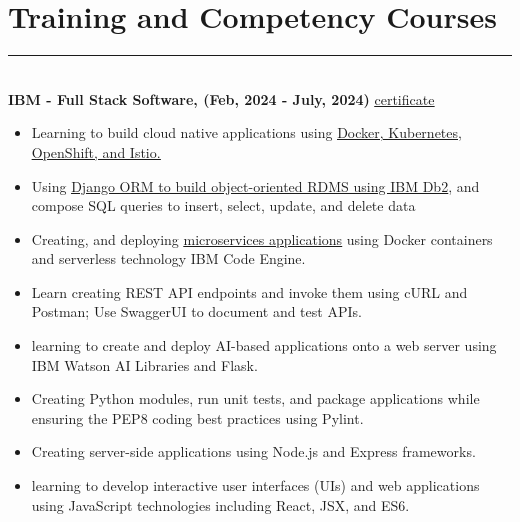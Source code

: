 \documentclass[12pt]{article}
\begin{document}
\vspace{-5mm}\section*{\fontsize{14}{1}\selectfont\color{color_29791}Training and Competency Courses}\vspace{-9pt} 
\rule{\textwidth}{0.4pt}
\vspace{2pt}
\\\textbf{IBM - Full Stack Software, (Feb, 2024 - July, 2024)} \hspace{72mm} \href{https://coursera.org/share/a352ad6b5eef1f6443a48a21e561add4}{\underline{certificate}}
\vspace{-3mm}
\begin{itemize}
  \item \fontsize{9}{1}Learning to build cloud native applications using \href{https://coursera.org/share/5705b6b914c0600090105451c32dd8d0}{\underline{Docker, Kubernetes, OpenShift, and Istio.}}
  \vspace{-3mm}
  \item Using \href{https://coursera.org/share/069696f4c4cbb78e2c12acb663c4a1ee}{\underline{Django ORM to build object-oriented RDMS using IBM Db2}}, and compose SQL queries to insert, select, update, and delete data
  \vspace{-3mm}
  \item Creating, and deploying \href{https://coursera.org/share/dea435400069b14cf6579a09dce472ac}{\underline{microservices applications}} using Docker containers and serverless technology IBM Code Engine.
  \vspace{-3mm}
  \item Learn creating REST API endpoints and invoke them using cURL and Postman; Use SwaggerUI to document and test APIs.
   \vspace{-3mm}
  \item learning to create and deploy AI-based applications onto a web server using IBM Watson AI Libraries and Flask.
  \vspace{-3mm}
  \item Creating Python modules, run unit tests, and package applications while ensuring the PEP8 coding best practices using Pylint.
  \vspace{-3mm}
  \item Creating server-side applications using Node.js and Express frameworks.
  \vspace{-3mm}
  \item learning to develop interactive user interfaces (UIs) and web applications using JavaScript technologies including React, JSX, and ES6.
\end{itemize}
\end{document}
